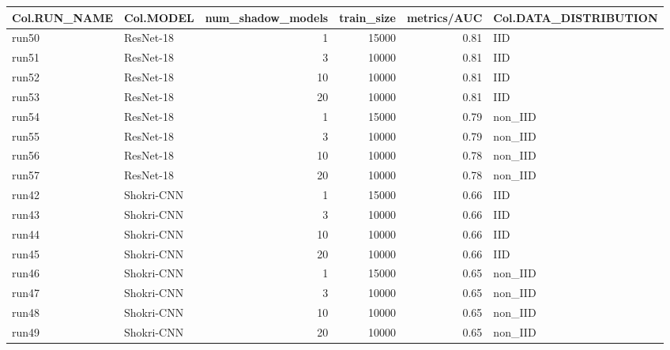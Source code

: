 \begin{tabular}{llrrrl}
\toprule
Col.RUN_NAME & Col.MODEL & num_shadow_models & train_size & metrics/AUC & Col.DATA_DISTRIBUTION \\
\midrule
run50 & ResNet-18 & 1 & 15000 & 0.81 & IID \\
run51 & ResNet-18 & 3 & 10000 & 0.81 & IID \\
run52 & ResNet-18 & 10 & 10000 & 0.81 & IID \\
run53 & ResNet-18 & 20 & 10000 & 0.81 & IID \\
run54 & ResNet-18 & 1 & 15000 & 0.79 & non_IID \\
run55 & ResNet-18 & 3 & 10000 & 0.79 & non_IID \\
run56 & ResNet-18 & 10 & 10000 & 0.78 & non_IID \\
run57 & ResNet-18 & 20 & 10000 & 0.78 & non_IID \\
run42 & Shokri-CNN & 1 & 15000 & 0.66 & IID \\
run43 & Shokri-CNN & 3 & 10000 & 0.66 & IID \\
run44 & Shokri-CNN & 10 & 10000 & 0.66 & IID \\
run45 & Shokri-CNN & 20 & 10000 & 0.66 & IID \\
run46 & Shokri-CNN & 1 & 15000 & 0.65 & non_IID \\
run47 & Shokri-CNN & 3 & 10000 & 0.65 & non_IID \\
run48 & Shokri-CNN & 10 & 10000 & 0.65 & non_IID \\
run49 & Shokri-CNN & 20 & 10000 & 0.65 & non_IID \\
\bottomrule
\end{tabular}
